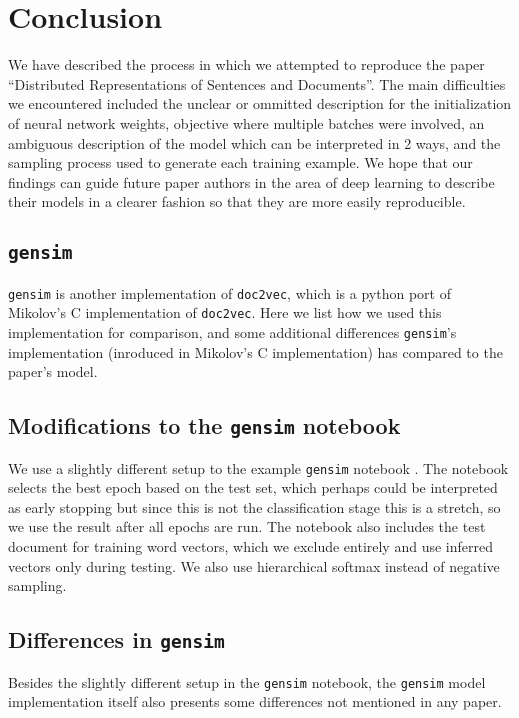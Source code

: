 \documentclass{article}
\begin{document}
\section{Conclusion}
We have described the process in which we attempted to reproduce the paper ``Distributed Representations of Sentences and Documents''. The main difficulties we encountered included the unclear or ommitted description for the initialization of neural network weights, objective where multiple batches were involved, an ambiguous description of the model which can be interpreted in 2 ways, and the sampling process used to generate each training example. We hope that our findings can guide future paper authors in the area of deep learning to describe their models in a clearer fashion so that they are more easily reproducible.

\begin{appendices}
\section{\texttt{gensim}} \label{sec:gensim}
\texttt{gensim} is another implementation of \texttt{doc2vec}, which is a python port of Mikolov's C implementation of \texttt{doc2vec}. Here we list how we used this implementation for comparison, and some additional differences \texttt{gensim}'s implementation (inroduced in Mikolov's C implementation) has compared to the paper's model.

\subsection{Modifications to the \texttt{gensim} notebook}
We use a slightly different setup to the example \texttt{gensim} notebook \citep{mohr_gensim_2017}. The notebook selects the best epoch based on the test set, which perhaps could be interpreted as early stopping but since this is not the classification stage this is a stretch, so we use the result after all epochs are run. The notebook also includes the test document for training word vectors, which we exclude entirely and use inferred vectors only during testing. We also use hierarchical softmax instead of negative sampling.

\subsection{Differences in \texttt{gensim}}
Besides the slightly different setup in the \texttt{gensim} notebook, the \texttt{gensim} model implementation itself also presents some differences not mentioned in any paper.


\end{appendices}
\end{document}
